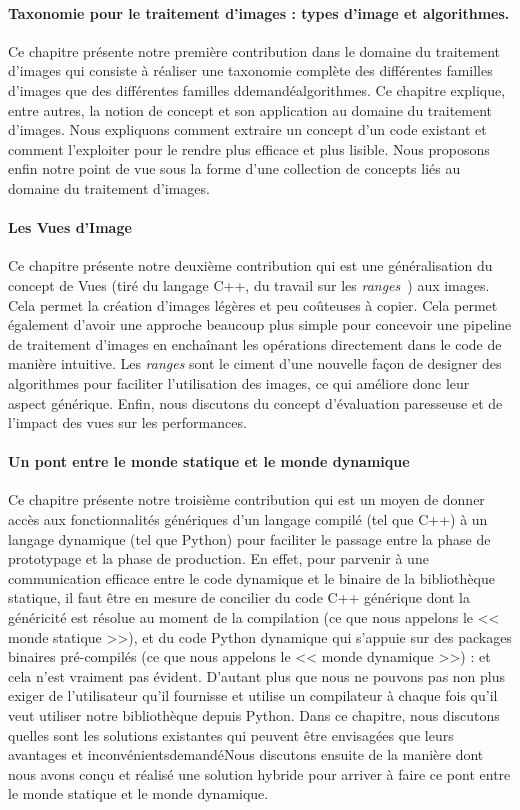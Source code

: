 \paragraph{Taxonomie pour le traitement d'images : types d'image et algorithmes.} Ce chapitre présente notre première
contribution dans le domaine du traitement d'images qui consiste à réaliser une taxonomie complète des différentes
familles d'images que des différentes familles ddemandéalgorithmes. Ce chapitre explique, entre autres, la notion de
concept et son application au domaine du traitement d'images. Nous expliquons comment extraire un concept d'un code
existant et comment l'exploiter pour le rendre plus efficace et plus lisible. Nous proposons enfin notre point de vue
sous la forme d'une collection de concepts liés au domaine du traitement d'images.

\paragraph{Les Vues d'Image} Ce chapitre présente notre deuxième contribution qui est une généralisation du concept de
Vues (tiré du langage C++, du travail sur les \emph{ranges}~\parencite{niebler.2018.ranges}) aux images. Cela permet la
création d'images légères et peu coûteuses à copier. Cela permet également d'avoir une approche beaucoup plus simple
pour concevoir une pipeline de traitement d'images en enchaînant les opérations directement dans le code de manière
intuitive. Les \emph{ranges} sont le ciment d'une nouvelle façon de designer des algorithmes pour faciliter
l'utilisation des images, ce qui améliore donc leur aspect générique. Enfin, nous discutons du concept d'évaluation
paresseuse et de l'impact des vues sur les performances.

\paragraph{Un pont entre le monde statique et le monde dynamique} Ce chapitre présente notre troisième contribution qui
est un moyen de donner accès aux fonctionnalités génériques d'un langage compilé (tel que C++) à un langage dynamique
(tel que Python) pour faciliter le passage entre la phase de prototypage et la phase de production. En effet, pour
parvenir à une communication efficace entre le code dynamique et le binaire de la bibliothèque statique, il faut être en
mesure de concilier du code C++ générique dont la généricité est résolue au moment de la compilation (ce que nous
appelons le << monde statique >>), et du code Python dynamique qui s'appuie sur des packages binaires pré-compilés (ce
que nous appelons le << monde dynamique >>) : et cela n'est vraiment pas évident. D'autant plus que nous ne pouvons pas
non plus exiger de l'utilisateur qu'il fournisse et utilise un compilateur à chaque fois qu'il veut utiliser notre
bibliothèque depuis Python. Dans ce chapitre, nous discutons quelles sont les solutions existantes qui peuvent être
envisagées que leurs avantages et inconvénientsdemandéNous discutons ensuite de la manière dont nous avons conçu et
réalisé une solution hybride pour arriver à faire ce pont entre le monde statique et le monde dynamique.


